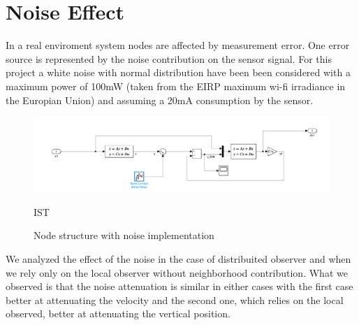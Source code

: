 \section{Noise Effect}
In a real enviroment system nodes are affected by measurement error. One error source is represented by the noise contribution on the sensor signal.
For this project a white noise with normal distribution have been been considered with a maximum power of 100mW (taken from the EIRP maximum wi-fi irradiance 
in the Europian Union) and assuming a 20mA consumption by the sensor. 

\begin{figure}[H]
        \centering
        \includegraphics[width=\textwidth]{img/node_structure_w_noise.PNG}
        \caption{IST}
    \caption{Node structure with noise implementation}
\end{figure}

We analyzed the effect of the noise in the case of distribuited observer and when we rely only on the local observer without neighborhood contribution.
What we observed is that the noise attenuation is similar in either cases with the first case better at attenuating the velocity and the second one, which relies on the 
local observed, better at attenuating the vertical position.

